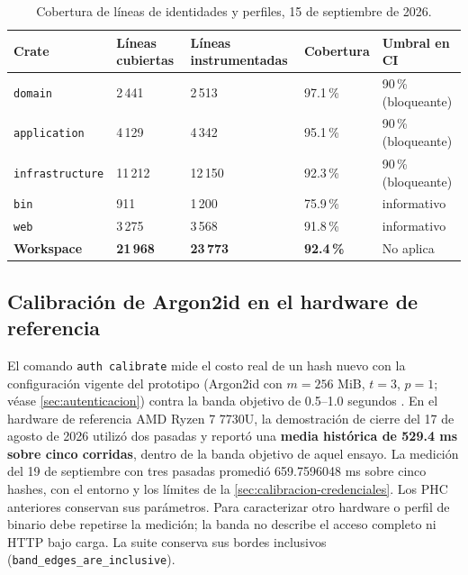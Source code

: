 \begin{table}[H]
  \centering
  \caption{Cobertura de líneas de identidades y perfiles, 15 de septiembre de 2026.}
  \label{tab:pruebas-cobertura-identidades}
  \begin{tabularx}{\linewidth}{@{}l R{2.2cm} R{2.9cm} R{2.0cm} X@{}}
    \toprule
    \textbf{Crate} & \textbf{Líneas cubiertas} & \textbf{Líneas instrumentadas} & \textbf{Cobertura} & \textbf{Umbral en CI} \\
    \midrule
    \texttt{domain}         & 2\,441 & 2\,513 & 97.1\,\% & 90\,\% (bloqueante) \\
    \texttt{application}    & 4\,129 & 4\,342 & 95.1\,\% & 90\,\% (bloqueante) \\
    \texttt{infrastructure} & 11\,212 & 12\,150 & 92.3\,\% & 90\,\% (bloqueante) \\
    \texttt{bin}            & 911 & 1\,200 & 75.9\,\% & informativo \\
    \texttt{web}            & 3\,275 & 3\,568 & 91.8\,\% & informativo \\
    \midrule
    \textbf{Workspace}      & \textbf{21\,968} & \textbf{23\,773} & \textbf{92.4\,\%} & No aplica \\
    \bottomrule
  \end{tabularx}
\end{table}

\subsection{Calibración de Argon2id en el hardware de referencia}\label{sec:matriz-argon}

El comando \texttt{auth calibrate} mide el costo real de un hash nuevo con la configuración vigente del prototipo (Argon2id con $m=256$ MiB, $t=3$, $p=1$; véase \cref{sec:autenticacion}) contra la banda objetivo de 0.5--1.0 segundos \cite{owasp_pwstorage2024,biryukov2021}. En el hardware de referencia AMD Ryzen 7 7730U, la demostración de cierre del 17 de agosto de 2026 utilizó dos pasadas y reportó una \textbf{media histórica de 529.4 ms sobre cinco corridas}, dentro de la banda objetivo de aquel ensayo. La medición del 19 de septiembre con tres pasadas promedió 659.7596048 ms sobre cinco hashes, con el entorno y los límites de la \cref{sec:calibracion-credenciales}. Los PHC anteriores conservan sus parámetros. Para caracterizar otro hardware o perfil de binario debe repetirse la medición; la banda no describe el acceso completo ni HTTP bajo carga. La suite conserva sus bordes inclusivos (\texttt{band\_edges\_are\_inclusive}).

